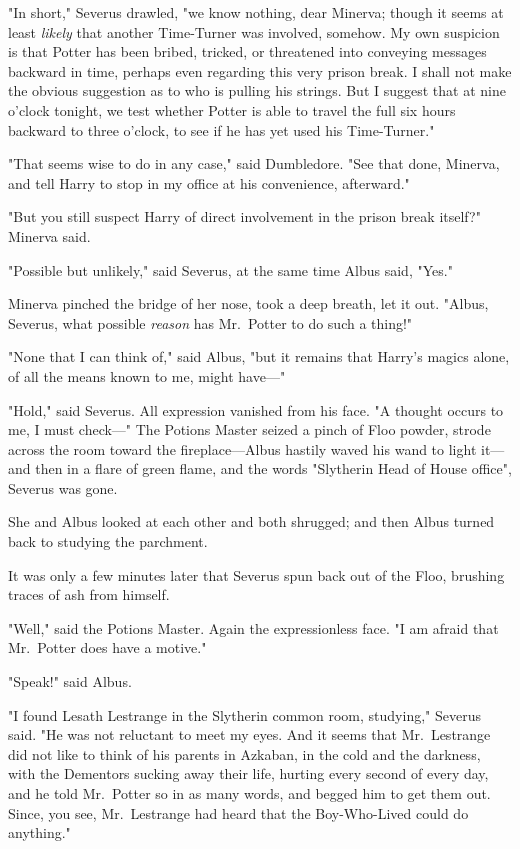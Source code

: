 "In short," Severus drawled, "we know nothing, dear Minerva; though it seems at
least \emph{likely} that another Time-Turner was involved, somehow. My own
suspicion is that Potter has been bribed, tricked, or threatened into conveying
messages backward in time, perhaps even regarding this very prison break. I
shall not make the obvious suggestion as to who is pulling his strings. But I
suggest that at nine o'clock tonight, we test whether Potter is able to travel
the full six hours backward to three o'clock, to see if he has yet used his
Time-Turner."

"That seems wise to do in any case," said Dumbledore. "See that done, Minerva,
and tell Harry to stop in my office at his convenience, afterward."

"But you still suspect Harry of direct involvement in the prison break itself?"
Minerva said.

"Possible but unlikely," said Severus, at the same time Albus said, "Yes."

Minerva pinched the bridge of her nose, took a deep breath, let it out. "Albus,
Severus, what possible \emph{reason} has Mr.~Potter to do such a thing!"

"None that I can think of," said Albus, "but it remains that Harry's magics
alone, of all the means known to me, might have---"

"Hold," said Severus. All expression vanished from his face. "A thought occurs
to me, I must check---" The Potions Master seized a pinch of Floo powder,
strode across the room toward the fireplace---Albus hastily waved his wand to
light it---and then in a flare of green flame, and the words "Slytherin Head of
House office", Severus was gone.

She and Albus looked at each other and both shrugged; and then Albus turned
back to studying the parchment.

It was only a few minutes later that Severus spun back out of the Floo,
brushing traces of ash from himself.

"Well," said the Potions Master. Again the expressionless face. "I am afraid
that Mr.~Potter does have a motive."

"Speak!" said Albus.

"I found Lesath Lestrange in the Slytherin common room, studying," Severus
said. "He was not reluctant to meet my eyes. And it seems that Mr.~Lestrange
did not like to think of his parents in Azkaban, in the cold and the darkness,
with the Dementors sucking away their life, hurting every second of every day,
and he told Mr.~Potter so in as many words, and begged him to get them out.
Since, you see, Mr.~Lestrange had heard that the Boy-Who-Lived could do
anything."

